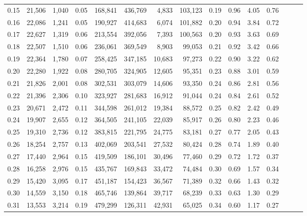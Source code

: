 \begin{tabular}{rrrrrrrrrrrrrrr}
0.15 &  21,506 &  1,040 &  0.05 &  168,841 &  436,769 &    4,833 &  103,123 &  0.19 &  0.96 &  4.05 &      0.76 \\
0.16 &  22,086 &  1,241 &  0.05 &  190,927 &  414,683 &    6,074 &  101,882 &  0.20 &  0.94 &  3.84 &      0.72 \\
0.17 &  22,627 &  1,319 &  0.06 &  213,554 &  392,056 &    7,393 &  100,563 &  0.20 &  0.93 &  3.63 &      0.69 \\
0.18 &  22,507 &  1,510 &  0.06 &  236,061 &  369,549 &    8,903 &   99,053 &  0.21 &  0.92 &  3.42 &      0.66 \\
0.19 &  22,364 &  1,780 &  0.07 &  258,425 &  347,185 &   10,683 &   97,273 &  0.22 &  0.90 &  3.22 &      0.62 \\
0.20 &  22,280 &  1,922 &  0.08 &  280,705 &  324,905 &   12,605 &   95,351 &  0.23 &  0.88 &  3.01 &      0.59 \\
0.21 &  21,826 &  2,001 &  0.08 &  302,531 &  303,079 &   14,606 &   93,350 &  0.24 &  0.86 &  2.81 &      0.56 \\
0.22 &  21,396 &  2,306 &  0.10 &  323,927 &  281,683 &   16,912 &   91,044 &  0.24 &  0.84 &  2.61 &      0.52 \\
0.23 &  20,671 &  2,472 &  0.11 &  344,598 &  261,012 &   19,384 &   88,572 &  0.25 &  0.82 &  2.42 &      0.49 \\
0.24 &  19,907 &  2,655 &  0.12 &  364,505 &  241,105 &   22,039 &   85,917 &  0.26 &  0.80 &  2.23 &      0.46 \\
0.25 &  19,310 &  2,736 &  0.12 &  383,815 &  221,795 &   24,775 &   83,181 &  0.27 &  0.77 &  2.05 &      0.43 \\
0.26 &  18,254 &  2,757 &  0.13 &  402,069 &  203,541 &   27,532 &   80,424 &  0.28 &  0.74 &  1.89 &      0.40 \\
0.27 &  17,440 &  2,964 &  0.15 &  419,509 &  186,101 &   30,496 &   77,460 &  0.29 &  0.72 &  1.72 &      0.37 \\
0.28 &  16,258 &  2,976 &  0.15 &  435,767 &  169,843 &   33,472 &   74,484 &  0.30 &  0.69 &  1.57 &      0.34 \\
0.29 &  15,420 &  3,095 &  0.17 &  451,187 &  154,423 &   36,567 &   71,389 &  0.32 &  0.66 &  1.43 &      0.32 \\
0.30 &  14,559 &  3,150 &  0.18 &  465,746 &  139,864 &   39,717 &   68,239 &  0.33 &  0.63 &  1.30 &      0.29 \\
0.31 &  13,553 &  3,214 &  0.19 &  479,299 &  126,311 &   42,931 &   65,025 &  0.34 &  0.60 &  1.17 &      0.27 \\

\end{tabular}
